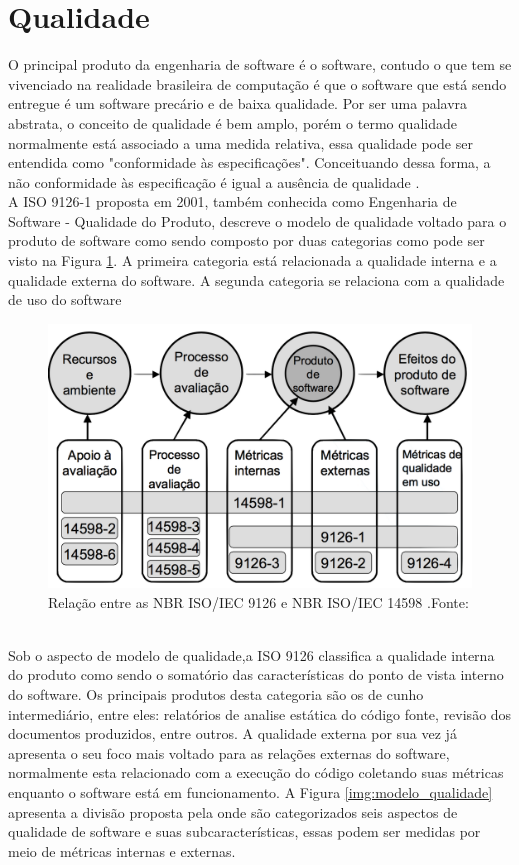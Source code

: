 \section{Qualidade}
	O principal produto da engenharia de software é o software, contudo o que tem se vivenciado na realidade brasileira de computação é que o software que está sendo entregue é um software precário e de baixa qualidade. Por ser uma palavra abstrata, o conceito de qualidade é bem amplo, porém o termo qualidade normalmente está associado a uma medida relativa, essa qualidade pode ser entendida como "conformidade às especificações". Conceituando dessa forma, a não conformidade às especificação é igual a ausência de qualidade \cite{Paduelli}.
\\ A ISO 9126-1 proposta em 2001, também conhecida como Engenharia de Software - Qualidade do Produto, descreve o modelo de qualidade voltado para o produto de software como sendo composto por duas categorias como pode ser visto na Figura \ref{img:relacao_iso}. A primeira categoria está relacionada a qualidade interna e a qualidade externa do software. A segunda categoria se relaciona com a qualidade de uso do software \cite{_nbr_2016}
\graphicspath{{figuras/}}
\begin{figure}
\centering
\includegraphics[scale=0.40]{ISO}
\caption{Relação entre as NBR ISO/IEC 9126 e NBR ISO/IEC 14598 .Fonte:\cite{_nbr_2016}}
\label{img:relacao_iso}
\end{figure}
\\ Sob o aspecto de modelo de qualidade,a ISO 9126 classifica a qualidade interna do produto como sendo o somatório das características do ponto de vista interno do software. Os principais produtos desta categoria são os de cunho intermediário, entre eles: relatórios de analise estática do código fonte, revisão dos documentos produzidos, entre outros. A qualidade externa por sua vez já apresenta o seu foco mais voltado para as relações externas do software, normalmente esta relacionado com a execução do código coletando suas métricas enquanto o software está em funcionamento. A Figura \ref{img:modelo_qualidade} apresenta a divisão proposta pela \cite{_nbr_2016} onde são categorizados seis aspectos de qualidade de software e suas subcaracterísticas, essas podem ser medidas por meio de métricas internas e externas. 
